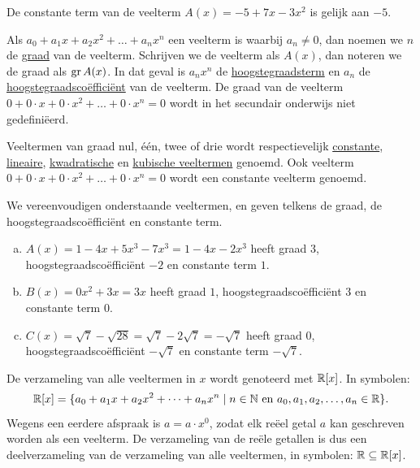 \documentclass{ximera}
\begin{document}
\begin{example} 
De constante term van de veelterm $A(x) = -5 + 7x - 3x^2$ is gelijk aan $-5$.  
\end{example} 

Als $a_0 + a_1x + a_2x^2 + \dots + a_n x^n$ een veelterm is waarbij $a_n \neq 0$, dan noemen we $n$ de \underline{graad} van de veelterm. Schrijven we de veelterm als $A(x)$, dan noteren we de graad als $\operatorname{gr} A(x)$. In dat geval is $a_nx^n$ de \underline{hoogstegraadsterm} en $a_n$ de \underline{hoogstegraadsco\"effici\"ent} van de veelterm. De graad van de veelterm $0 + 0\cdot x + 0 \cdot x^2 + \dots + 0\cdot x^n = 0$ wordt in het secundair onderwijs niet gedefini\"eerd.

Veeltermen van graad nul, \'e\'en, twee of drie wordt respectievelijk \underline{constante}, \underline{lineaire}, \linebreak \underline{kwadratische} en \underline{kubische veeltermen} genoemd. Ook veelterm $0 + 0\cdot x + 0 \cdot x^2 + \dots + 0\cdot x^n = 0$ wordt een constante veelterm genoemd.

\begin{example} 
We vereenvoudigen onderstaande veeltermen, en geven telkens de graad, de hoogstegraadsco\"effici\"ent en constante term.
\begin{enumerate}[(a)]
\item
$A(x) = 1-4x+5x^3-7x^3 = 1 - 4x - 2x^3$ heeft graad $3$, hoogstegraadsco\"effici\"ent $-2$ en constante term $1$.
\item
$B(x) = 0x^2 + 3x = 3x$ heeft graad $1$, hoogstegraadsco\"effici\"ent $3$ en constante term $0$.
\item
$C(x) = \sqrt{7}-\sqrt{28} = \sqrt{7}-2\sqrt{7} = -\sqrt{7}$ heeft graad $0$, hoogstegraadsco\"effici\"ent $-\sqrt{7}$ en constante term $-\sqrt{7}$.
\end{enumerate}
\end{example} 

De verzameling van alle veeltermen in $x$ wordt genoteerd met $\mathbb{R}[x]$. In symbolen:
\[
\mathbb{R}[x] = \{a_0 + a_1 x + a_2 x^2 + \dots + a_n x^n \mid \text{$n \in \mathbb{N}$ en $a_0,a_1,a_2,\ldots,a_n \in \mathbb{R}$} \}.
\]
Wegens een eerdere afspraak is $a = a\cdot x^0$, zodat elk re\"eel getal $a$ kan geschreven worden als een veelterm. De verzameling van de re\"ele getallen is dus een deelverzameling
van de verzameling van alle veeltermen, in symbolen: $\mathbb{R} \subseteq \mathbb{R}[x]$. 
\end{document}
